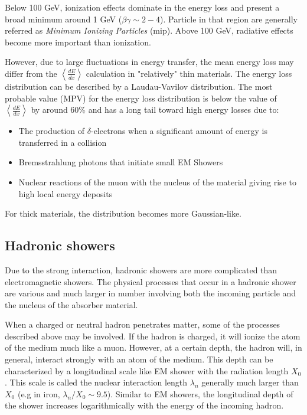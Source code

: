 Below 100 GeV, ionization effects dominate in the energy loss and present a broad minimum around 1 GeV ($\beta\gamma \sim 2-4$). Particle in that region are generally referred as \textit{Minimum Ionizing Particles} (\acrshort{mip}). Above 100 GeV, radiative effects become more important than ionization.

However, due to large fluctuations in energy transfer, the mean energy loss may differ from the $\left<\frac{dE}{dx}\right>$ calculation in "relatively" thin materials. The energy loss distribution can be described by a Laudau-Vavilov distribution. The most probable value (MPV) for the energy loss distribution is below the value of $\left<\frac{dE}{dx}\right>$ by around 60\% and has a long tail toward high energy losses due to:
\begin{itemize}
  \item The production of $\delta$-electrons when a significant amount of energy is transferred in a collision
  \item Bremsstrahlung photons that initiate small EM Showers
  \item Nuclear reactions of the muon with the nucleus of the material giving rise to high local energy deposits
\end{itemize}
For thick materials, the distribution becomes more Gaussian-like.

\subsection{Hadronic showers}
\label{subsec:HadShowers}

Due to the strong interaction, hadronic showers are more complicated than electromagnetic showers. The physical processes that occur in a hadronic shower are various and much larger in number involving both the incoming particle and the nucleus of the absorber material.

When a charged or neutral hadron penetrates matter, some of the processes described above may be involved. If the hadron is charged, it will ionize the atom of the medium much like a muon. However, at a certain depth, the hadron will, in general, interact strongly with an atom of the medium. This depth can be characterized by a longitudinal scale like EM shower with the radiation length $X_0$. This scale is called the nuclear interaction length $\lambda_n$ generally much larger than $X_0$ (e.g in iron, $\lambda_n/X_0 \sim 9.5$). Similar to EM showers, the longitudinal depth of the shower increases logarithmically with the energy of the incoming hadron.

